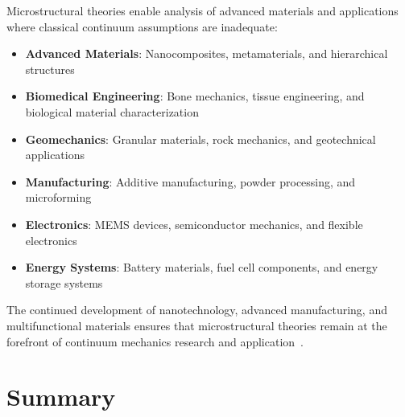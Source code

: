 Microstructural theories enable analysis of advanced materials and applications where classical continuum assumptions are inadequate:

\begin{itemize}
\item \textbf{Advanced Materials}: Nanocomposites, metamaterials, and hierarchical structures
\item \textbf{Biomedical Engineering}: Bone mechanics, tissue engineering, and biological material characterization
\item \textbf{Geomechanics}: Granular materials, rock mechanics, and geotechnical applications
\item \textbf{Manufacturing}: Additive manufacturing, powder processing, and microforming
\item \textbf{Electronics}: MEMS devices, semiconductor mechanics, and flexible electronics
\item \textbf{Energy Systems}: Battery materials, fuel cell components, and energy storage systems
\end{itemize}

The continued development of nanotechnology, advanced manufacturing, and multifunctional materials ensures that microstructural theories remain at the forefront of continuum mechanics research and application~\autocite{Sadd.2019}.

\section{Summary}

